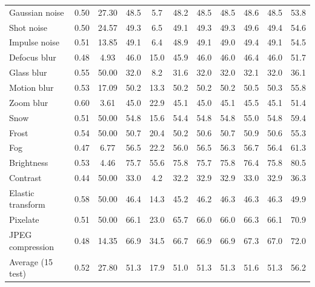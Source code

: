 \begin{table}[t]
\begin{tabular}{l|cc|cc|cc|cccc}
        Gaussian noise & 0.50 & 27.30 & 48.5 & 5.7 & 48.2 & 48.5 & 48.5 & 48.6 & 48.5 & 53.8 \\
        Shot noise & 0.50 & 24.57 & 49.3 & 6.5 & 49.1 & 49.3 & 49.3 & 49.6 & 49.4 & 54.6 \\
        Impulse noise & 0.51 & 13.85 & 49.1 & 6.4 & 48.9 & 49.1 & 49.0 & 49.4 & 49.1 & 54.5 \\
        Defocus blur & 0.48 & 4.93 & 46.0 & 15.0 & 45.9 & 46.0 & 46.0 & 46.4 & 46.0 & 51.7 \\
        Glass blur & 0.55 & 50.00 & 32.0 & 8.2 & 31.6 & 32.0 & 32.0 & 32.1 & 32.0 & 36.1 \\
        Motion blur & 0.53 & 17.09 & 50.2 & 13.3 & 50.2 & 50.2 & 50.2 & 50.5 & 50.3 & 55.8 \\
        Zoom blur & 0.60 & 3.61 & 45.0 & 22.9 & 45.1 & 45.0 & 45.1 & 45.5 & 45.1 & 51.4 \\
        Snow & 0.51 & 50.00 & 54.8 & 15.6 & 54.4 & 54.8 & 54.8 & 55.0 & 54.8 & 59.4 \\
        Frost & 0.54 & 50.00 & 50.7 & 20.4 & 50.2 & 50.6 & 50.7 & 50.9 & 50.6 & 55.3 \\
        Fog & 0.47 & 6.77 & 56.5 & 22.2 & 56.0 & 56.5 & 56.3 & 56.7 & 56.4 & 61.3 \\
        Brightness & 0.53 & 4.46 & 75.7 & 55.6 & 75.8 & 75.7 & 75.8 & 76.4 & 75.8 & 80.5 \\
        Contrast & 0.44 & 50.00 & 33.0 & 4.2 & 32.2 & 32.9 & 32.9 & 33.0 & 32.9 & 36.3 \\
        Elastic transform & 0.58 & 50.00 & 46.4 & 14.3 & 45.2 & 46.2 & 46.3 & 46.3 & 46.3 & 49.9 \\
        Pixelate & 0.51 & 50.00 & 66.1 & 23.0 & 65.7 & 66.0 & 66.0 & 66.3 & 66.1 & 70.9 \\
        JPEG compression & 0.48 & 14.35 & 66.9 & 34.5 & 66.7 & 66.9 & 66.9 & 67.3 & 67.0 & 72.0 \\
        \midrule
        Average (15 test) & 0.52 & 27.80 & 51.3 & 17.9 & 51.0 & 51.3 & 51.3 & 51.6 & 51.3 & 56.2 \\
        \bottomrule
    \end{tabular}
\end{table}
